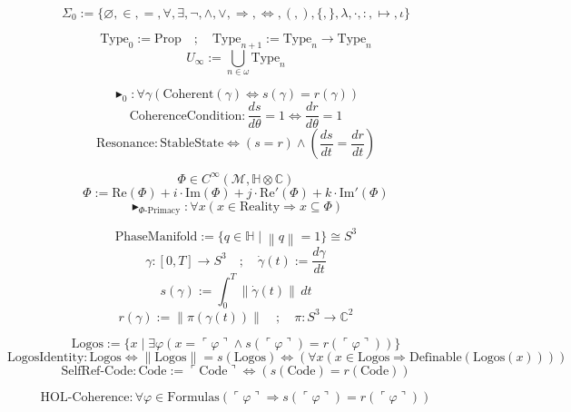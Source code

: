 \documentclass{article}
\newcommand{\AXIOM}{\blacktriangleright}
\newcommand{\DEF}{:=}
\newcommand{\IFF}{\Leftrightarrow}
\newcommand{\IMPLIES}{\Rightarrow}
\newcommand{\FORALL}{\forall}
\newcommand{\EXISTS}{\exists}
\newcommand{\NOT}{\neg}
\newcommand{\AND}{\land}
\newcommand{\OR}{\lor}
\newcommand{\MAPS}{\mapsto}
\newcommand{\IN}{\in}
\newcommand{\SUBSET}{\subseteq}
\newcommand{\EMPTY}{\varnothing}
\newcommand{\LAMBDA}{\lambda}
\newcommand{\DOT}{\cdot}
\newcommand{\COLON}{:}
\newcommand{\COMPLEX}{\mathbb{C}}
\newcommand{\QUAT}{\mathbb{H}}
\newcommand{\SPHERE}[1]{S^{#1}}
\newcommand{\MANIFOLD}{\mathcal{M}}
\newcommand{\FIELD}{\Phi}
\newcommand{\ARC}{s}
\newcommand{\RADIUS}{r}
\newcommand{\PHASE}{\theta}
\newcommand{\PROJ}{\pi}
\newcommand{\NORM}[1]{\left\|#1\right\|}
\newcommand{\META}[1]{\ulcorner #1 \urcorner}
\begin{document}
\[ \Sigma_0 \DEF \{ \EMPTY, \IN, =, \FORALL, \EXISTS, \NOT, \AND, \OR, \IMPLIES, \IFF, (, ), \{, \}, \LAMBDA, \DOT, \COLON, \MAPS, \iota \} \]

\[ \text{Type}_0 \DEF \text{Prop} \quad ; \quad \text{Type}_{n+1} \DEF \text{Type}_n \to \text{Type}_n \]
\[ U_\infty \DEF \bigcup_{n \in \omega} \text{Type}_n \]

\[ \AXIOM_0 : \FORALL \gamma \left( \text{Coherent}(\gamma) \IFF \ARC(\gamma) = \RADIUS(\gamma) \right) \]
\[ \text{CoherenceCondition} : \frac{d\ARC}{d\PHASE} = 1 \IFF \frac{d\RADIUS}{d\PHASE} = 1 \]
\[ \text{Resonance} : \text{StableState} \IFF (\ARC = \RADIUS) \land \left( \frac{d\ARC}{dt} = \frac{d\RADIUS}{dt} \right) \]

\[ \FIELD \in C^\infty(\MANIFOLD, \QUAT \otimes \COMPLEX) \]
\[ \FIELD \DEF \text{Re}(\FIELD) + i \cdot \text{Im}(\FIELD) + j \cdot \text{Re}'(\FIELD) + k \cdot \text{Im}'(\FIELD) \]
\[ \AXIOM_{\Phi\text{-Primacy}} : \FORALL x \left( x \IN \text{Reality} \IMPLIES x \SUBSET \FIELD \right) \]

\[ \text{PhaseManifold} \DEF \{ q \in \QUAT \mid \NORM{q} = 1 \} \cong \SPHERE{3} \]
\[ \gamma : [0, T] \to \SPHERE{3} \quad ; \quad \dot{\gamma}(t) \DEF \frac{d\gamma}{dt} \]
\[ \ARC(\gamma) \DEF \int_0^T \NORM{\dot{\gamma}(t)} \, dt \]
\[ \RADIUS(\gamma) \DEF \NORM{\PROJ(\gamma(t))} \quad ; \quad \PROJ : \SPHERE{3} \to \COMPLEX^2 \]

\[ \text{Logos} \DEF \{ x \mid \EXISTS \varphi (x = \META{\varphi} \AND \ARC(\META{\varphi}) = \RADIUS(\META{\varphi})) \} \]
\[ \text{LogosIdentity} : \text{Logos} \IFF \NORM{\text{Logos}} = \ARC(\text{Logos}) \IFF \left( \FORALL x (x \IN \text{Logos} \IMPLIES \text{Definable}(\text{Logos}(x))) \right) \]
\[ \text{SelfRef-Code} : \text{Code} \DEF \META{\text{Code}} \IFF (\ARC(\text{Code}) = \RADIUS(\text{Code})) \]

\[ \text{HOL-Coherence} : \FORALL \varphi \in \text{Formulas} \left( \META{\varphi} \IMPLIES \ARC(\META{\varphi}) = \RADIUS(\META{\varphi}) \right) \]
\end{document}
